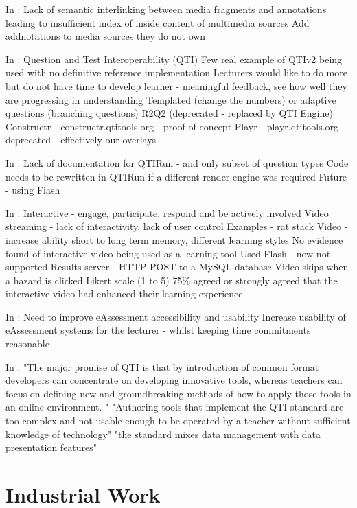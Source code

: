 In \cite{eps273063}:
Lack of semantic interlinking between media fragments and annotations leading to insufficient index of inside content of multimedia sources
Add addnotations to media sources they do not own

In \cite{eps265979}:
Question and Test Interoperability (QTI)
Few real example of QTIv2 being used with no definitive reference implementation
Lecturers would like to do more but do not have time to develop 
learner - meaningful feedback, see how well they are progressing in understanding
Templated (change the numbers) or adaptive questions (branching questions)
R2Q2 (deprecated - replaced by QTI Engine)
Constructr - constructr.qtitools.org - proof-of-concept
Playr - playr.qtitools.org - deprecated - effectively our overlays

In \cite{eps262835}:
Lack of documentation for QTIRun - and only subset of question types
Code needs to be rewritten in QTIRun if a different render engine was required
Future - using Flash

In \cite{eps267281}:
Interactive - engage, participate, respond and be actively involved
Video streaming - lack of interactivity, lack of user control
Examples - rat stack
Video - increase ability short to long term memory, different learning styles
No evidence found of interactive video being used as a learning tool
Used Flash - now not supported
Results server - HTTP POST to a MySQL database
Video skips when a hazard is clicked
Likert scale (1 to 5)
75\% agreed or strongly agreed that the interactive video had enhanced their learning experience

In \cite{eps271236}:
Need to improve eAssessment accessibility and usability
Increase usability of eAssessment systems for the lecturer - whilst keeping time commitments reasonable

In \cite{wikieassessment}:
"The major promise of QTI is that by introduction of common format developers can concentrate on developing innovative tools, whereas teachers can focus on defining new and groundbreaking methods of how to apply those tools in an online environment. "
"Authoring tools that implement the QTI standard are too complex and not usable enough to be operated by a teacher without sufficient knowledge of technology"
"the standard mixes data management with data presentation features"
\fi
\section{Industrial Work} 
\label{Section:Industrial Work}